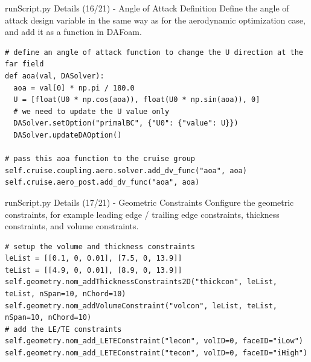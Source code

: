 \documentclass{bredelebeamer}
\begin{document}
\begin{frame}[fragile]{runScript.py Details (16/21) - \large Angle of Attack Definition}
Define the angle of attack design variable in the same way as for the aerodynamic optimization case, and add it as a function in DAFoam.
\scriptsize
\lstset{ language=bash }
\begin{lstlisting}
# define an angle of attack function to change the U direction at the far field
def aoa(val, DASolver):
  aoa = val[0] * np.pi / 180.0
  U = [float(U0 * np.cos(aoa)), float(U0 * np.sin(aoa)), 0]
  # we need to update the U value only
  DASolver.setOption("primalBC", {"U0": {"value": U}})
  DASolver.updateDAOption()

# pass this aoa function to the cruise group
self.cruise.coupling.aero.solver.add_dv_func("aoa", aoa)
self.cruise.aero_post.add_dv_func("aoa", aoa)
\end{lstlisting}
\normalsize
\end{frame}

\begin{frame}[fragile]{runScript.py Details (17/21) - \large Geometric Constraints}
Configure the geometric constraints, for example leading edge / trailing edge constraints, thickness constraints, and volume constraints.
\scriptsize
\lstset{ language=bash }
\begin{lstlisting}
# setup the volume and thickness constraints
leList = [[0.1, 0, 0.01], [7.5, 0, 13.9]]
teList = [[4.9, 0, 0.01], [8.9, 0, 13.9]]
self.geometry.nom_addThicknessConstraints2D("thickcon", leList, teList, nSpan=10, nChord=10)
self.geometry.nom_addVolumeConstraint("volcon", leList, teList, nSpan=10, nChord=10)
# add the LE/TE constraints
self.geometry.nom_add_LETEConstraint("lecon", volID=0, faceID="iLow")
self.geometry.nom_add_LETEConstraint("tecon", volID=0, faceID="iHigh")
\end{lstlisting}
\normalsize
\end{frame}
\end{document}
